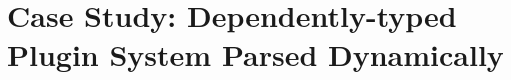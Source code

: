 \documentclass[demotion-paper.tex]{subfiles}
\begin{document}
\section{Case Study: Dependently-typed Plugin System Parsed Dynamically}
\end{document}
